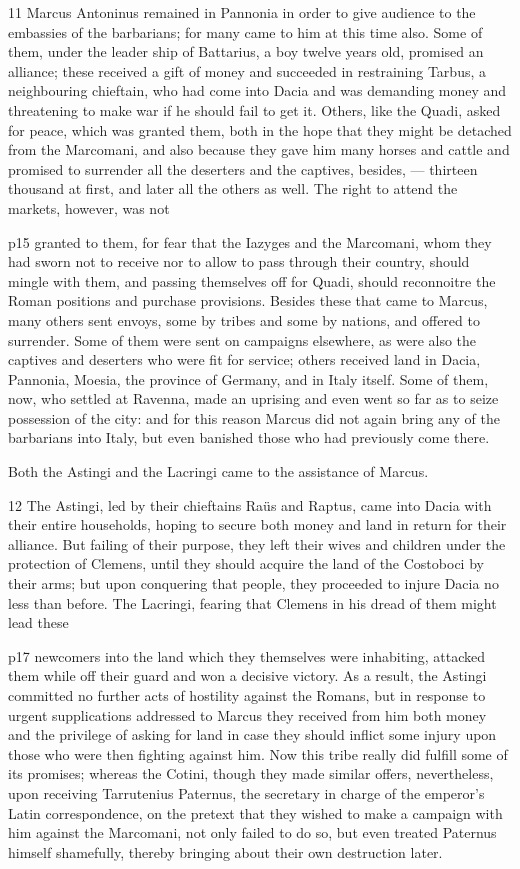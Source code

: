 11
Marcus Antoninus remained in Pannonia in order to give audience to the embassies of the barbarians; for many came to him at this time also. Some of them, under the leader ­ship of Battarius, a boy twelve years old, promised an alliance; these received a gift of money and succeeded in restraining Tarbus, a neighbouring chieftain, who had come into Dacia and was demanding money and threatening to make war if he should fail to get it. Others, like the Quadi, asked for peace, which was granted them, both in the hope that they might be detached from the Marcomani, and also because they gave him many horses and cattle and promised to surrender all the deserters and the captives, besides, \texthebrew{—} thirteen thousand at first, and later all the others as well. The right to attend the markets, however, was not

p15 granted to them, for fear that the Iazyges and the Marcomani, whom they had sworn not to receive nor to allow to pass through their country, should mingle with them, and passing themselves off for Quadi, should reconnoitre the Roman positions and purchase provisions. Besides these that came to Marcus, many others sent envoys, some by tribes and some by nations, and offered to surrender. Some of them were sent on campaigns elsewhere, as were also the captives and deserters who were fit for service; others received land in Dacia, Pannonia, Moesia, the province of Germany, and in Italy itself. Some of them, now, who settled at Ravenna, made an uprising and even went so far as to seize possession of the city: and for this reason Marcus did not again bring any of the barbarians into Italy, but even banished those who had previously come there.

Both the Astingi and the Lacringi came to the assistance of Marcus.

12
The Astingi, led by their chieftains Raüs and Raptus, came into Dacia with their entire households, hoping to secure both money and land in return for their alliance. But failing of their purpose, they left their wives and children under the protection of Clemens, until they should acquire the land of the Costoboci by their arms; but upon conquering that people, they proceeded to injure Dacia no less than before. The Lacringi, fearing that Clemens in his dread of them might lead these

p17 newcomers into the land which they themselves were inhabiting, attacked them while off their guard and won a decisive victory. As a result, the Astingi committed no further acts of hostility against the Romans, but in response to urgent supplications addressed to Marcus they received from him both money and the privilege of asking for land in case they should inflict some injury upon those who were then fighting against him. Now this tribe really did fulfill some of its promises; whereas the Cotini, though they made similar offers, nevertheless, upon receiving Tarrutenius Paternus, the secretary in charge of the emperor's Latin correspondence, on the pretext that they wished to make a campaign with him against the Marcomani, not only failed to do so, but even treated Paternus himself shamefully, thereby bringing about their own destruction later.

